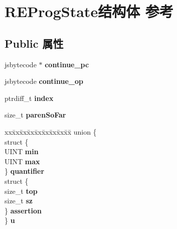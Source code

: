 \hypertarget{struct_r_e_prog_state}{}\section{R\+E\+Prog\+State结构体 参考}
\label{struct_r_e_prog_state}
\subsection*{Public 属性}
\begin{DoxyCompactItemize}
\item 
\mbox{\label{struct_r_e_prog_state_a1b15e19476ec05d94e2270f55058a6aa}} 
jsbytecode $\ast$ {\bfseries continue\+\_\+pc}
\item 
\mbox{\label{struct_r_e_prog_state_aad94b66f230af4a493e022effce80b8b}} 
jsbytecode {\bfseries continue\+\_\+op}
\item 
\mbox{\label{struct_r_e_prog_state_aedc8eb7465536693b682b24f80e3ad06}} 
ptrdiff\+\_\+t {\bfseries index}
\item 
\mbox{\label{struct_r_e_prog_state_a9bfe46451edf47b087bbcd2c37cc3e7b}} 
size\+\_\+t {\bfseries paren\+So\+Far}
\item 
\mbox{\label{struct_r_e_prog_state_ad4edf7a820555b9c4bbe63d3d821b8dc}} 
\begin{tabbing}
xx\=xx\=xx\=xx\=xx\=xx\=xx\=xx\=xx\=\kill
union \{\\
\>struct \{\\
\>\>UINT {\bfseries min}\\
\>\>UINT {\bfseries max}\\
\>\} {\bfseries quantifier}\\
\>struct \{\\
\>\>size\_t {\bfseries top}\\
\>\>size\_t {\bfseries sz}\\
\>\} {\bfseries assertion}\\
\} {\bfseries u}\\


\end{tabbing}
\end{DoxyCompactItemize}
